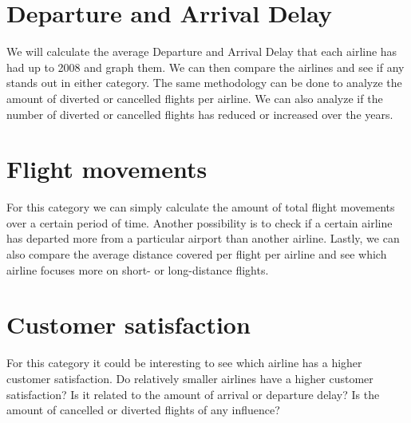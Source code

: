 \documentclass[11pt,oneside]{book}
\begin{document}
\section*{Departure and Arrival Delay}
We will calculate the average Departure and Arrival Delay that each airline has had up to 2008 and graph them. We can then compare the airlines and see if any stands out in either category. The same methodology can be done to analyze the amount of diverted or cancelled flights per airline. We can also analyze if the number of diverted or cancelled flights has reduced or increased over the years. 
\section*{Flight movements}
For this category we can simply calculate the amount of total flight movements over a certain period of time. Another possibility is to check if a certain airline has departed more from a particular airport than another airline. Lastly, we can also compare the average distance covered per flight per airline and see which airline focuses more on short- or long-distance flights. 
\section*{Customer satisfaction}
For this category it could be interesting to see which airline has a higher customer satisfaction. Do relatively smaller airlines have a higher customer satisfaction? Is it related to the amount of arrival or departure delay? Is the amount of cancelled or diverted flights of any influence?  


\end{document}
